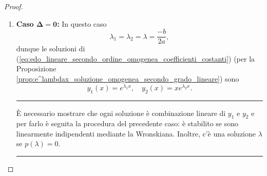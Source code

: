 \begin{proof}
\begin{enumerate}
		\item \textbf{Caso $\boldsymbol{\Delta=0}$:} In questo caso
		\begin{equation*}
			\lambda_1=\lambda_2=\lambda=\frac{-b}{2a},
		\end{equation*}
		dunque le soluzioni di (\ref{eq:edo_lineare_secondo_ordine_omogenea_coefficienti_costanti}) (per la Proposizione \ref{prop:e^lambdax_soluzione_omogenea_secondo_grado_lineare}) sono
		\begin{equation*}
			y_1(x)=e^{\lambda_1 x},\quad y_2(x) = xe^{\lambda_2 x}.
		\end{equation*}
		\hrule\vspace{-2px}
		È necessario mostrare che ogni soluzione è combinazione lineare di $y_1$ e $y_2$ e per farlo è seguita la procedura del precedente caso: è stabilito se sono linearmente indipendenti mediante la Wronskiana. Inoltre, c'è una soluzione $\lambda$ se $p(\lambda)=0$.
		\hrule\vspace{2px}
		

\end{enumerate}
\end{proof}
